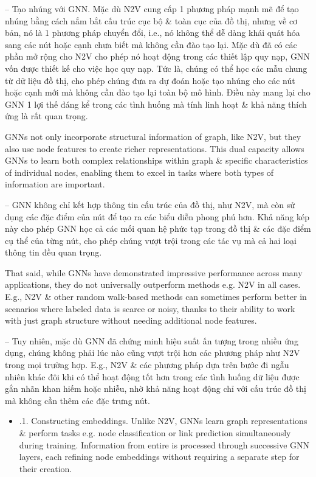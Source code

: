 \documentclass{article}
\begin{document}
\begin{itemize}
\begin{itemize}
       -- {\sf Tạo nhúng với GNN.} Mặc dù N2V cung cấp 1 phương pháp mạnh mẽ để tạo nhúng bằng cách nắm bắt cấu trúc cục bộ \& toàn cục của đồ thị, nhưng về cơ bản, nó là 1 phương pháp chuyển đổi, i.e., nó không thể dễ dàng khái quát hóa sang các nút hoặc cạnh chưa biết mà không cần đào tạo lại. Mặc dù đã có các phần mở rộng cho N2V cho phép nó hoạt động trong các thiết lập quy nạp, GNN vốn được thiết kế cho việc học quy nạp. Tức là, chúng có thể học các mẫu chung từ dữ liệu đồ thị, cho phép chúng đưa ra dự đoán hoặc tạo nhúng cho các nút hoặc cạnh mới mà không cần đào tạo lại toàn bộ mô hình. Điều này mang lại cho GNN 1 lợi thế đáng kể trong các tình huống mà tính linh hoạt \& khả năng thích ứng là rất quan trọng.

       GNNs not only incorporate structural information of graph, like N2V, but they also use node features to create richer representations. This dual capacity allows GNNs to learn both complex relationships within graph \& specific characteristics of individual nodes, enabling them to excel in tasks where both types of information are important.

       -- GNN không chỉ kết hợp thông tin cấu trúc của đồ thị, như N2V, mà còn sử dụng các đặc điểm của nút để tạo ra các biểu diễn phong phú hơn. Khả năng kép này cho phép GNN học cả các mối quan hệ phức tạp trong đồ thị \& các đặc điểm cụ thể của từng nút, cho phép chúng vượt trội trong các tác vụ mà cả hai loại thông tin đều quan trọng.

       That said, while GNNs have demonstrated impressive performance across many applications, they do not universally outperform methods e.g. N2V in all cases. E.g., N2V \& other random walk-based methods can sometimes perform better in scenarios where labeled data is scarce or noisy, thanks to their ability to work with just graph structure without needing additional node features.

       -- Tuy nhiên, mặc dù GNN đã chứng minh hiệu suất ấn tượng trong nhiều ứng dụng, chúng không phải lúc nào cũng vượt trội hơn các phương pháp như N2V trong mọi trường hợp. E.g., N2V \& các phương pháp dựa trên bước đi ngẫu nhiên khác đôi khi có thể hoạt động tốt hơn trong các tình huống dữ liệu được gắn nhãn khan hiếm hoặc nhiễu, nhờ khả năng hoạt động chỉ với cấu trúc đồ thị mà không cần thêm các đặc trưng nút.
       \begin{itemize}
           \item {.1. Constructing embeddings.} Unlike N2V, GNNs learn graph representations \& perform tasks e.g. node classification or link prediction simultaneously during training. Information from entire is processed through successive GNN layers, each refining node embeddings without requiring a separate step for their creation.


\end{itemize}
\end{itemize}
\end{itemize}
\end{document}
